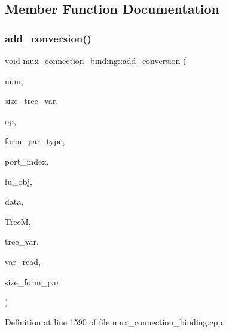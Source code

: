 \subsection{Member Function Documentation}
\mbox{\label{classmux__connection__binding_aa34c2f95532bff6fa7d281583bad6a3f}} 
\subsubsection{\texorpdfstring{add\+\_\+conversion()}{add\_conversion()}}
{\footnotesize\ttfamily void mux\+\_\+connection\+\_\+binding\+::add\+\_\+conversion (\begin{DoxyParamCaption}\item[{unsigned int}]{num,  }\item[{unsigned int}]{size\+\_\+tree\+\_\+var,  }\item[{\hyperlink{graph_8hpp_a80e30b305ae26da1989a155d199d7e2c}{Vertex\+Iterator}}]{op,  }\item[{unsigned int}]{form\+\_\+par\+\_\+type,  }\item[{unsigned int}]{port\+\_\+index,  }\item[{const \hyperlink{generic__obj_8hpp_acb533b2ef8e0fe72e09a04d20904ca81}{generic\+\_\+obj\+Ref}}]{fu\+\_\+obj,  }\item[{const \hyperlink{op__graph_8hpp_a9a0b240622c47584bee6951a6f5de746}{Op\+Graph\+Const\+Ref}}]{data,  }\item[{const \hyperlink{tree__manager_8hpp_a96ff150c071ce11a9a7a1e40590f205e}{tree\+\_\+manager\+Ref}}]{TreeM,  }\item[{unsigned int}]{tree\+\_\+var,  }\item[{std\+::vector$<$ \hyperlink{classHLS__manager_a972627cc658afa992590b9d2bf1a1e87}{H\+L\+S\+\_\+manager\+::io\+\_\+binding\+\_\+type} $>$ \&}]{var\+\_\+read,  }\item[{unsigned int}]{size\+\_\+form\+\_\+par }\end{DoxyParamCaption})\hspace{0.3cm}{\ttfamily [private]}}



Definition at line 1590 of file mux\+\_\+connection\+\_\+binding.\+cpp.



